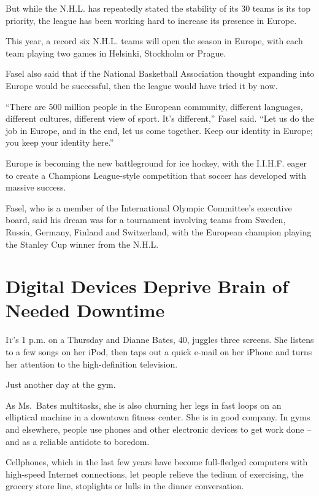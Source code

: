 ﻿\documentclass[12pt]{article}
\begin{document}
But while the N.H.L. has repeatedly stated the stability of its 30 teams is its top priority, the
league has been working hard to increase its presence in Europe.

This year, a record six N.H.L. teams will open the season in Europe, with each team playing two
games in Helsinki, Stockholm or Prague.

Fasel also said that if the National Basketball Association thought expanding into Europe would be
successful, then the league would have tried it by now.

``There are 500 million people in the European community, different languages, different cultures,
different view of sport. It's different,'' Fasel said. ``Let us do the job in Europe, and in the
end, let us come together. Keep our identity in Europe; you keep your identity here.''

Europe is becoming the new battleground for ice hockey, with the I.I.H.F. eager to create a
Champions League-style competition that soccer has developed with massive success.

Fasel, who is a member of the International Olympic Committee's executive board, said his dream was
for a tournament involving teams from Sweden, Russia, Germany, Finland and Switzerland, with the
European champion playing the Stanley Cup winner from the N.H.L.

\pagebreak
\section{Digital Devices Deprive Brain of Needed Downtime}

\lettrine{I}{t}'s 1 p.m. on a Thursday and Dianne Bates, 40, juggles three
screens. She listens to a few songs on her iPod, then taps out a quick e-mail on her iPhone and
turns her attention to the high-definition television.

Just another day at the gym.

As Ms.~Bates multitasks, she is also churning her legs in fast loops on an elliptical machine in a
downtown fitness center. She is in good company. In gyms and elsewhere, people use phones and other
electronic devices to get work done -- and as a reliable antidote to boredom.

Cellphones, which in the last few years have become full-fledged computers with high-speed Internet
connections, let people relieve the tedium of exercising, the grocery store line, stoplights or
lulls in the dinner conversation.
\end{document}
